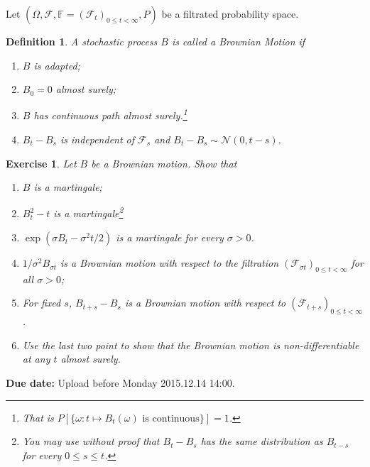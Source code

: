 \documentclass[DIV=classic,a4paper,10pt]{scrartcl}
\newtheorem{exercise}[theorem]{Exercise}
\newtheorem{definition}[theorem]{Definition}
\theoremstyle{nonumberplain}
\numberwithin{equation}{section}
\begin{document}
Let $(\Omega,\mathcal{F},\mathbb{F}=(\mathcal{F}_t)_{0\leq t<\infty},P)$ be a filtrated probability space.
\begin{definition}
    A stochastic process $B$ is called a Brownian Motion if
    \begin{enumerate}[label=\textbf{(\Roman*)}]
        \item $B$ is adapted;
        \item $B_0=0$ almost surely;
        \item $B$ has continuous path almost surely.\footnote{That is $P[\{\omega\colon t\mapsto B_t(\omega)\text{ is continuous}\}]=1$.}
        \item $B_t-B_s$ is independent of $\mathcal{F}_s$ and $B_t-B_s\sim \mathcal{N}(0,t-s)$. 
    \end{enumerate}
\end{definition}
\begin{exercise}
    Let $B$ be a Brownian motion.
    Show that
    \begin{enumerate}[label=\textit{(\roman*)}]
        \item $B$ is a martingale;
        \item $B^2_t-t$ is a martingale\footnote{You may use without proof that $B_t-B_s$ has the same distribution as $B_{t-s}$ for every $0\leq s\leq t$.}
        \item $\exp(\sigma B_t-\sigma^2 t/2)$ is a martingale for every $\sigma>0$.
        \item $1/\sigma^2 B_{\sigma t}$ is a Brownian motion with respect to the filtration $(\mathcal{F}_{\sigma t})_{0\leq t<\infty}$ for all $\sigma>0$;
        \item For fixed $s$, $B_{t+s}-B_s$ is a Brownian motion with respect to $(\mathcal{F}_{t+s})_{0\leq t <\infty}$.
        \item Use the last two point to show that the Brownian motion is non-differentiable at any $t$ almost surely.
    \end{enumerate}
\end{exercise}

\smallskip
\noindent
\textbf{Due date:} Upload before Monday 2015.12.14 14:00.
\end{document}
